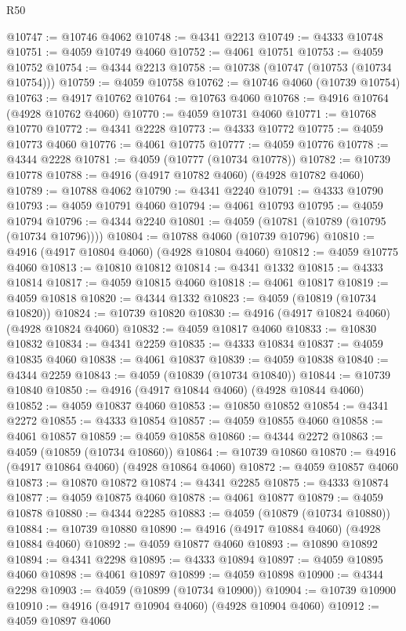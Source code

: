 \begin{lexlean}{R50}
\begin{coremodule}
@10747 := @10746 @4062
@10748 := @4341 @2213
@10749 := @4333 @10748
@10751 := @4059 @10749 @4060
@10752 := @4061 @10751
@10753 := @4059 @10752
@10754 := @4344 @2213
@10758 := @10738 (@10747 (@10753 (@10734 @10754)))
@10759 := @4059 @10758
@10762 := @10746 @4060 (@10739 @10754)
@10763 := @4917 @10762
@10764 := @10763 @4060
@10768 := @4916 @10764 (@4928 @10762 @4060)
@10770 := @4059 @10731 @4060
@10771 := @10768 @10770
@10772 := @4341 @2228
@10773 := @4333 @10772
@10775 := @4059 @10773 @4060
@10776 := @4061 @10775
@10777 := @4059 @10776
@10778 := @4344 @2228
@10781 := @4059 (@10777 (@10734 @10778))
@10782 := @10739 @10778
@10788 := @4916 (@4917 @10782 @4060) (@4928 @10782 @4060)
@10789 := @10788 @4062
@10790 := @4341 @2240
@10791 := @4333 @10790
@10793 := @4059 @10791 @4060
@10794 := @4061 @10793
@10795 := @4059 @10794
@10796 := @4344 @2240
@10801 := @4059 (@10781 (@10789 (@10795 (@10734 @10796))))
@10804 := @10788 @4060 (@10739 @10796)
@10810 := @4916 (@4917 @10804 @4060) (@4928 @10804 @4060)
@10812 := @4059 @10775 @4060
@10813 := @10810 @10812
@10814 := @4341 @1332
@10815 := @4333 @10814
@10817 := @4059 @10815 @4060
@10818 := @4061 @10817
@10819 := @4059 @10818
@10820 := @4344 @1332
@10823 := @4059 (@10819 (@10734 @10820))
@10824 := @10739 @10820
@10830 := @4916 (@4917 @10824 @4060) (@4928 @10824 @4060)
@10832 := @4059 @10817 @4060
@10833 := @10830 @10832
@10834 := @4341 @2259
@10835 := @4333 @10834
@10837 := @4059 @10835 @4060
@10838 := @4061 @10837
@10839 := @4059 @10838
@10840 := @4344 @2259
@10843 := @4059 (@10839 (@10734 @10840))
@10844 := @10739 @10840
@10850 := @4916 (@4917 @10844 @4060) (@4928 @10844 @4060)
@10852 := @4059 @10837 @4060
@10853 := @10850 @10852
@10854 := @4341 @2272
@10855 := @4333 @10854
@10857 := @4059 @10855 @4060
@10858 := @4061 @10857
@10859 := @4059 @10858
@10860 := @4344 @2272
@10863 := @4059 (@10859 (@10734 @10860))
@10864 := @10739 @10860
@10870 := @4916 (@4917 @10864 @4060) (@4928 @10864 @4060)
@10872 := @4059 @10857 @4060
@10873 := @10870 @10872
@10874 := @4341 @2285
@10875 := @4333 @10874
@10877 := @4059 @10875 @4060
@10878 := @4061 @10877
@10879 := @4059 @10878
@10880 := @4344 @2285
@10883 := @4059 (@10879 (@10734 @10880))
@10884 := @10739 @10880
@10890 := @4916 (@4917 @10884 @4060) (@4928 @10884 @4060)
@10892 := @4059 @10877 @4060
@10893 := @10890 @10892
@10894 := @4341 @2298
@10895 := @4333 @10894
@10897 := @4059 @10895 @4060
@10898 := @4061 @10897
@10899 := @4059 @10898
@10900 := @4344 @2298
@10903 := @4059 (@10899 (@10734 @10900))
@10904 := @10739 @10900
@10910 := @4916 (@4917 @10904 @4060) (@4928 @10904 @4060)
@10912 := @4059 @10897 @4060

\end{coremodule}
\end{lexlean}
